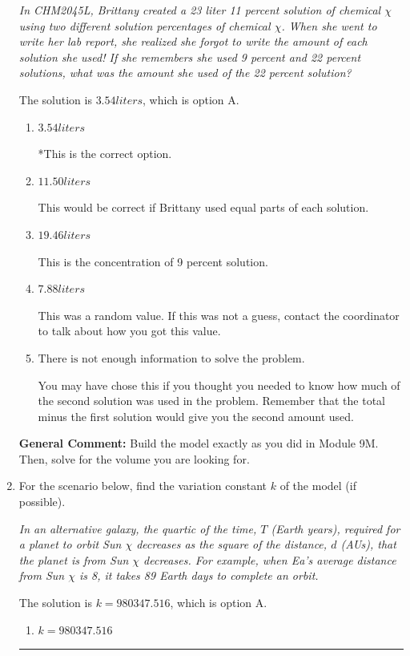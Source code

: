 \documentclass{extbook}[14pt]
\newcommand{\litem}[1]{\item #1

\rule{\textwidth}{0.4pt}}
\begin{document}
\begin{enumerate}
{\begin{center}
    \textit{ In CHM2045L, Brittany created a 23 liter 11 percent solution of chemical $\chi$ using two different solution percentages of chemical $\chi$. When she went to write her lab report, she realized she forgot to write the amount of each solution she used! If she remembers she used 9 percent and 22 percent solutions, what was the amount she used of the 22 percent solution? }
\end{center}
The solution is \( 3.54 liters \), which is option A.\begin{enumerate}[label=\Alph*.]
\item \( 3.54 liters \)

*This is the correct option.
\item \( 11.50 liters \)

This would be correct if Brittany used equal parts of each solution.
\item \( 19.46 liters \)

This is the concentration of 9 percent solution.
\item \( 7.88 liters \)

This was a random value. If this was not a guess, contact the coordinator to talk about how you got this value.
\item \( \text{There is not enough information to solve the problem.} \)

You may have chose this if you thought you needed to know how much of the second solution was used in the problem. Remember that the total minus the first solution would give you the second amount used.
\end{enumerate}

\textbf{General Comment:} Build the model exactly as you did in Module 9M. Then, solve for the volume you are looking for.
}
\litem{
For the scenario below, find the variation constant $k$ of the model (if possible).

\begin{center}
    \textit{ In an alternative galaxy, the quartic of the time, $T$ (Earth years), required for a planet to orbit Sun $\chi$ decreases as the square of the distance, $d$ (AUs), that the planet is from Sun $\chi$ decreases. For example, when Ea's average distance from Sun $\chi$ is 8, it takes 89 Earth days to complete an orbit. }
\end{center}
The solution is \( k = 980347.516 \), which is option A.\begin{enumerate}[label=\Alph*.]
\item \( k = 980347.516 \)


\end{enumerate}}
\end{enumerate}
\end{document}

